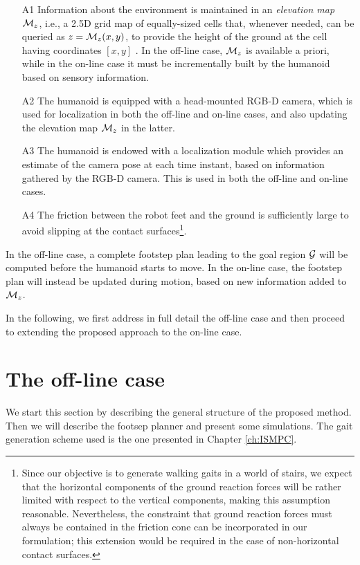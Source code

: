 \begin{itemize}

\item[A1] Information about the environment is maintained in an
{\em elevation map} ${\cal M}_{z}$, i.e., a 2.5D grid map of equally-sized
cells that, whenever needed, can be queried as $z = {\cal M}_{z}(x,y)$, to
provide the height of the ground at the cell having coordinates $[x,y]$
\cite{Burgard2016WorldModeling}.
In the off-line case, ${\cal M}_{z}$ is available a priori, while in the
on-line case it must be incrementally built by the humanoid based on sensory
information. 
    
\item[A2] The humanoid is equipped with a head-mounted RGB-D camera, which is
used for localization in both the off-line and on-line cases, and also updating
the elevation map ${\cal M}_{z}$ in the latter.
    
\item[A3] The humanoid is endowed with a localization module which provides an
estimate of the camera pose at each time instant, based on information gathered
by the RGB-D camera. This is used in both the off-line and on-line cases.

\item[A4] The friction between the robot feet and the ground is sufficiently
large to avoid slipping at the contact surfaces\footnote{Since our objective
is to generate walking gaits in a world of stairs, we expect that the horizontal
components of the ground reaction forces will be rather limited with respect
to the vertical components, making this assumption reasonable. Nevertheless,
the constraint that ground reaction forces must always be contained in the
friction cone can be incorporated in our formulation; this extension would be
required in the case of non-horizontal contact surfaces.}.

\end{itemize}

In the off-line case, a complete footstep plan leading to the goal region
$\cal G$ will be computed before the humanoid starts to move. In the
on-line case, the footstep plan will instead be updated during motion, based on
new information added to ${\cal M}_{z}$. 

In the following, we first address in full detail the off-line case and then
proceed to extending the proposed approach to the on-line case.

\section{The off-line case} 
\label{sec:WoS:offlineCase}
We start this section by describing the general structure of the proposed
method. Then we will describe the footsep planner and present some simulations.
The gait generation scheme used is the one presented in Chapter \ref{ch:ISMPC}.

